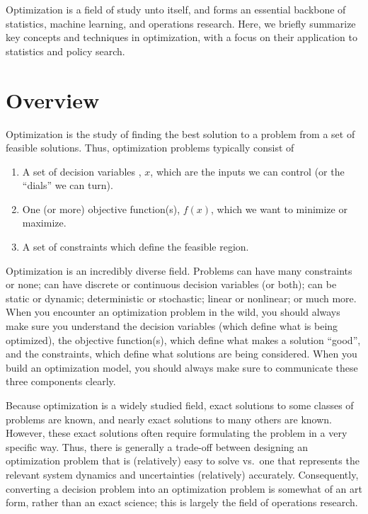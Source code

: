 \documentclass[
  letterpaper,
  DIV=11,
  numbers=noendperiod]{scrreprt}
\providecommand{\tightlist}{%
  \setlength{\itemsep}{0pt}\setlength{\parskip}{0pt}}
\begin{document}
Optimization is a field of study unto itself, and forms an essential
backbone of statistics, machine learning, and operations research. Here,
we briefly summarize key concepts and techniques in optimization, with a
focus on their application to statistics and policy search.

\section{Overview}\label{overview}

Optimization is the study of finding the best solution to a problem from
a set of feasible solutions. Thus, optimization problems typically
consist of

\begin{enumerate}
\def\labelenumi{\arabic{enumi}.}
\tightlist
\item
  A set of decision variables , \(x\), which are the inputs we can
  control (or the ``dials'' we can turn).
\item
  One (or more) objective function(s), \(f(x)\), which we want to
  minimize or maximize.
\item
  A set of constraints which define the feasible region.
\end{enumerate}

Optimization is an incredibly diverse field. Problems can have many
constraints or none; can have discrete or continuous decision variables
(or both); can be static or dynamic; deterministic or stochastic; linear
or nonlinear; or much more. When you encounter an optimization problem
in the wild, you should always make sure you understand the decision
variables (which define what is being optimized), the objective
function(s), which define what makes a solution ``good'', and the
constraints, which define what solutions are being considered. When you
build an optimization model, you should always make sure to communicate
these three components clearly.

Because optimization is a widely studied field, exact solutions to some
classes of problems are known, and nearly exact solutions to many others
are known. However, these exact solutions often require formulating the
problem in a very specific way. Thus, there is generally a trade-off
between designing an optimization problem that is (relatively) easy to
solve vs.~one that represents the relevant system dynamics and
uncertainties (relatively) accurately. Consequently, converting a
decision problem into an optimization problem is somewhat of an art
form, rather than an exact science; this is largely the field of
operations research.
\end{document}

